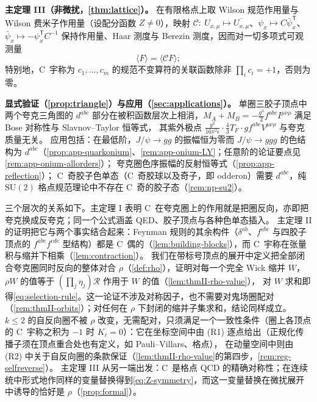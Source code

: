 \documentclass[UTF8,a4paper,11pt,fontset=fandol]{ctexart}
\theoremstyle{cplain}
\theoremstyle{cdefinition}
\theoremstyle{cremark}
\numberwithin{equation}{section}
\newcommand{\tp}{\mathsf{T}}                         %
\newcommand{\Cop}{\mathcal{C}}                       %
\newcommand{\Rop}{\mathcal{R}}                       %
\begin{document}
\begin{tcolorbox}[enhanced,breakable,title=本文主要结果,fonttitle=\bfseries,
  colback=blue!2!white,colframe=blue!50!black,boxrule=0.7pt,arc=2pt,
  left=6pt,right=6pt,top=4pt,bottom=4pt,before skip=8pt,after skip=8pt]
\smallskip
\textbf{主定理 III（非微扰，\cref{thm:lattice}）。}
在有限格点上取 Wilson 规范作用量与 Wilson 费米子作用量（设配分函数 $Z\neq0$），映射 $\Cop:\ U_{x,\mu}\mapsto\overline{U_{x,\mu}}$、$\psi_x\mapsto C\bar\psi_x^{\tp}$、$\bar\psi_x\mapsto-\psi_x^{\tp}C^{-1}$ 保持作用量、Haar 测度与 Berezin 测度，因而对一切多项式可观测量
\begin{equation*}
\langle F\rangle=\langle\Cop F\rangle ;
\end{equation*}
特别地，C~宇称为 $c_1,\dots,c_m$ 的规范不变算符的关联函数除非 $\prod_ic_i=+1$，否则为零。

\smallskip
\textbf{显式验证（\cref{prop:triangle}）与应用（\cref{sec:applications}）。}
单圈三胶子顶点中两个夸克三角图的 $d^{abc}$ 部分在被积函数层次上相消，$M_A+M_B=-\frac{g^3}{2}f^{abc}I^{\mu\nu\rho}$ 满足 Bose 对称性与 Slavnov--Taylor 恒等式，
其紫外极点 $\frac{g^2}{16\pi^2\epsilon}\cdot\frac43T_F\cdot gf^{abc}V^{\mu\nu\rho}$ 与夸克质量无关。
应用包括：在最低阶，$J/\psi\to gg$ 的振幅恒为零而 $J/\psi\to ggg$ 的色结构为 $d^{abc}$（\cref{prop:app-quarkonium}、\cref{rem:app-onium-LY}；任意阶的论证要点见\cref{rem:app-onium-allorders}）；
夸克圈色序振幅的反射恒等式（\cref{prop:app-reflection}）；
C~奇胶子色单态（C~奇胶球以及奇子，即 odderon）需要 $d^{abc}$，纯 $\mathrm{SU}(2)$ 格点规范理论中不存在 C~奇的胶子态（\cref{rem:np-su2}）。
\end{tcolorbox}

三个层次的关系如下。主定理 I 表明 C~在夸克圈上的作用就是把圈反向，亦即把夸克换成反夸克；同一个公式涵盖 QED、胶子顶点与各种色单态插入。
主定理 II 的证明把它与两个事实结合起来：Feynman 规则的其余构件（$\delta^{ab}$、$f^{abc}$ 与四胶子顶点的 $f^{abe}f^{cde}$ 型结构）都是 C~偶的（\cref{lem:building-blocks}），而 C~宇称在张量积与缩并下相乘（\cref{lem:contraction}）。
我们在带标号顶点的展开中定义把全部闭合夸克圈同时反向的整体对合 $\rho$（\cref{def:rho}），证明对每一个完全 Wick 缩并 $W$，$\rho W$ 的值等于 $(\prod_j\eta_j)\Rop$ 作用于 $W$ 的值（\cref{lem:thmII-rho-value}），
对 $W$ 求和即得\cref{eq:selection-rule}。这一论证不涉及对称因子，也不需要对鬼场圈配对（\cref{rem:thmII-orbits}）；对任何在 $\rho$ 下封闭的缩并子集求和，结论同样成立。
$k\le2$ 的自反向圈不被 $\rho$ 改变，无需配对，只须满足一个一致性条件（圈上各顶点的 C~宇称之积为 $-1$ 时 $K_\ell=0$）：它在坐标空间中由 (R1) 逐点给出（正规化传播子须在顶点重合处也有定义，如 Pauli--Villars、格点），
在动量空间中则由 (R2) 中关于自反向圈的条款保证（\cref{lem:thmII-rho-value}的第四步，\cref{rem:reg-selfreverse}）。
主定理 III 从另一端出发：C~是格点 QCD 的精确对称性；在连续统中形式地作同样的变量替换得到\cref{eq:Z-symmetry}，而这一变量替换在微扰展开中诱导的恰好是 $\rho$（\cref{prop:formal}）。
\end{document}
